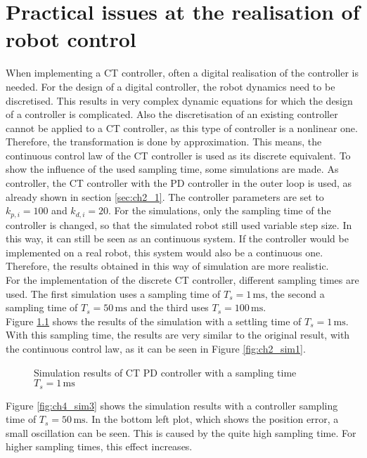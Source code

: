 \chapter{Practical issues at the realisation of robot control}
When implementing a \ac{CT} controller, often a digital realisation of the controller is needed. For the design of a digital controller, the robot dynamics need to be discretised. This results in very complex dynamic equations for which the design of a controller is complicated. Also the discretisation of an existing controller cannot be applied to a \ac{CT} controller, as this type of controller is a nonlinear one. Therefore, the transformation is done by approximation. This means, the continuous control law of the \ac{CT} controller is used as its discrete equivalent. To show the influence of the used sampling time, some simulations are made. As controller, the \ac{CT} controller with the PD controller in the outer loop is used, as already shown in section \ref{sec:ch2_1}. The controller parameters are set to $k_{p,i} = 100$ and $k_{d,i} = 20$. For the simulations, only the sampling time of the controller is changed, so that the simulated robot still used variable step size. In this way, it can still be seen as an continuous system. If the controller would be implemented on a real robot, this system would also be a continuous one. Therefore, the results obtained in this way of simulation are more realistic.\\
For the implementation of the discrete \ac{CT} controller, different sampling times are used. The first simulation uses a sampling time of $T_s = 1\,\mathrm{ms}$, the second a sampling time of $T_s = 50\,\mathrm{ms}$ and the third uses $T_s = 100\,\mathrm{ms}$.\\
Figure \ref{fig:ch4_sim1} shows the results of the simulation with a settling time of $T_s = 1\,\mathrm{ms}$. With this sampling time, the results are very similar to the original result, with the continuous control law, as it can be seen in Figure \ref{fig:ch2_sim1}.
\begin{figure}[H]
	\centering
	
	\caption{Simulation results of CT PD controller with a sampling time $T_s = 1\,\mathrm{ms}$}
	\label{fig:ch4_sim1}
\end{figure}
Figure \ref{fig:ch4_sim3} shows the simulation results with a controller sampling time of $T_s = 50\,\mathrm{ms}$. In the bottom left plot, which shows the position error, a small oscillation can be seen. This is caused by the quite high sampling time. For higher sampling times, this effect increases.
